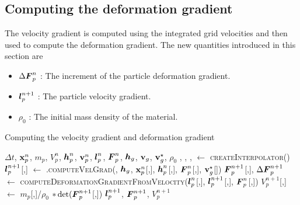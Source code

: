 \subsection{Computing the deformation gradient}
The velocity gradient is computed using the integrated grid velocities and then used to 
compute the deformation gradient. The new quantities introduced in this section are
\begin{itemize} 
  \setlength\itemsep{1pt}
  \item $\Delta\boldsymbol{F}_{p}^n$ : {\Ochre The increment of the particle deformation gradient.}
  \item $\boldsymbol{l}_p^{n+1}$ : {\Ochre The particle velocity gradient.}
  \item $\rho_0$ : {\Ochre The initial mass density of the material.}
\end{itemize}
\begin{breakablealgorithm}
  \caption{Computing the velocity gradient and deformation gradient}
  \begin{algorithmic}[1]
    \Require $\Delta t$, $\mathbf{x}_p^n$, $m_p$, $V_p^n$, $\boldsymbol{h}_p^n$, $\mathbf{v}_p^n$, $\boldsymbol{l}_p^n$, $\boldsymbol{F}_p^n$,
             $\boldsymbol{h}_g$, $\mathbf{v}_g$, $\mathbf{v}_g^\star$, $\rho_0$
             , ,
             , 
      \State {} $\leftarrow$ \textsc{createInterpolator}()
          \State $\boldsymbol{l}_p^{n+1}$[\TTmatl,\TTpart] $\leftarrow$ 
           .\textsc{computeVelGrad}(,
            $\boldsymbol{h}_g$, $\mathbf{x}_p^n$[\TTmatl,\TTpart], \WWRP
            $\boldsymbol{h}_p^n$[\TTmatl,\TTpart], $\boldsymbol{F}_p^n$[\TTmatl,\TTpart], 
            $\mathbf{v}_g^\star$[\TTmatl])
          \State $\boldsymbol{F}_p^{n+1}$[\TTmatl,\TTpart], $\Delta \boldsymbol{F}_p^{n+1}$ $\leftarrow$ 
            \textsc{computeDeformationGradientFromVelocity}($\boldsymbol{l}_p^n$[\TTmatl,\TTpart], \WWRP
            $\boldsymbol{l}_p^{n+1}$[\TTmatl,\TTpart], $\boldsymbol{F}_p^n$[\TTmatl,\TTpart])
          \State $V_p^{n+1}$[\TTmatl,\TTpart] $\leftarrow$ $m_p$[\TTmatl,\TTpart]/$\rho_0$ 
            $*\det(\boldsymbol{F}_p^{n+1}$[\TTmatl,\TTpart])
        \EndFor
      \EndFor
      \State \Return $\boldsymbol{l}_p^{n+1}$, $\boldsymbol{F}_p^{n+1}$, $V_p^{n+1}$
    \EndProcedure
  \end{algorithmic}
\end{breakablealgorithm}

